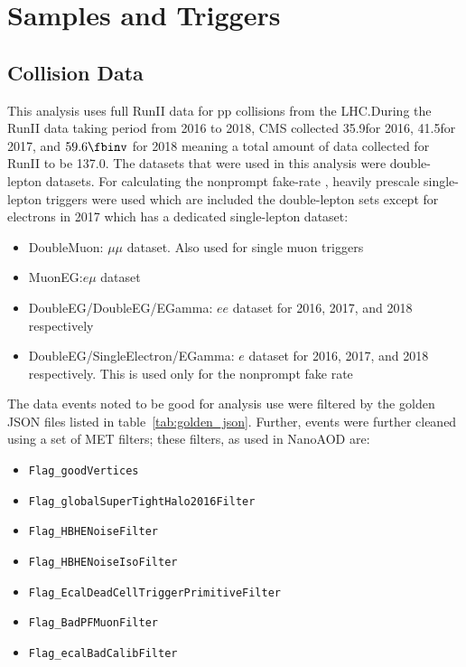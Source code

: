 
% 

\section{Samples and Triggers}

\subsection{Collision Data}
This analysis uses full RunII data for pp collisions from the LHC.\@ During the RunII data taking period from 2016 to 2018, CMS collected 35.9\fbinv for 2016, 41.5\fbinv for 2017, and $59.6\fbinv$ for 2018 meaning a total amount of data collected for RunII to be 137.0\fbinv. The datasets that were used in this analysis were double-lepton datasets. For calculating the nonprompt fake-rate , heavily prescale single-lepton triggers were used which are included the double-lepton sets except for electrons in 2017 which has a dedicated single-lepton dataset:

\begin{itemize}
  \item DoubleMuon: $\mu\mu$ dataset. Also used for single muon triggers
  \item MuonEG:\@ $e\mu$ dataset
  \item DoubleEG/DoubleEG/EGamma: $ee$ dataset for 2016, 2017, and 2018 respectively
  \item DoubleEG/SingleElectron/EGamma: $e$ dataset for 2016, 2017, and 2018 respectively. This is used only for the nonprompt fake rate
\end{itemize}

The data events noted to be good for analysis use were filtered by the golden JSON files listed in table~\ref{tab:golden_json}. Further, events were further cleaned using a set of MET filters; these filters, as used in NanoAOD are:

\begin{itemize}
  \item \texttt{Flag\_goodVertices}
  \item \texttt{Flag\_globalSuperTightHalo2016Filter}
  \item \texttt{Flag\_HBHENoiseFilter}
  \item \texttt{Flag\_HBHENoiseIsoFilter}
  \item \texttt{Flag\_EcalDeadCellTriggerPrimitiveFilter}
  \item \texttt{Flag\_BadPFMuonFilter}
  \item \texttt{Flag\_ecalBadCalibFilter}
\end{itemize}

